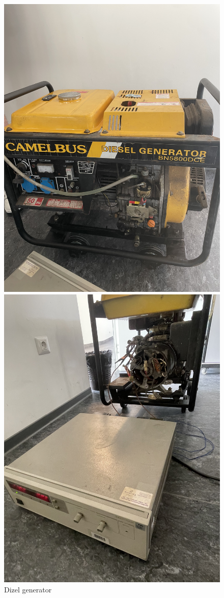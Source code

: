 \documentclass[a4paper, 11pt, titlepage]{article}
\begin{document}
\begin{figure}[htbp]
  \centering
  \begin{minipage}[b]{0.3\textwidth}
    \centering
    \includegraphics[angle = 270, width=0.75\linewidth]{IMG_4276.png}
    \caption{Dizel generator}
  \end{minipage}
  \hfill
  \begin{minipage}[b]{0.3\textwidth}
    \centering
    \includegraphics[angle = 270, width=0.75\linewidth]{IMG_4280.jpeg}

\end{minipage}
\end{figure}
\end{document}
